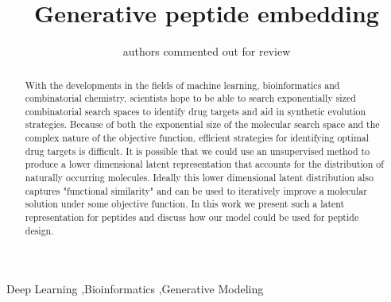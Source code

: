 \documentclass[final,1p,times,twocolumn]{elsarticle}
\begin{document}
\begin{frontmatter}


\title{Generative peptide embedding}




\author{authors commented out for review}

\begin{abstract}
With the developments in the fields of machine learning, bioinformatics and combinatorial chemistry, scientists hope to be able to search exponentially sized combinatorial search spaces to identify drug targets and aid in synthetic evolution strategies. Because of both the exponential size of the molecular search space and the complex nature of the objective function, efficient strategies for identifying optimal drug targets is difficult. It is possible that we could use an unsupervised method to produce a lower dimensional latent representation that accounts for the distribution of naturally occurring molecules. Ideally this lower dimensional latent distribution also captures "functional similarity" and can be used to iteratively improve a molecular solution under some objective function. In this work we present such a latent representation for peptides and discuss how our model could be used for peptide design.
\end{abstract}

\begin{keyword}
Deep Learning \sep Bioinformatics \sep Generative Modeling


\end{keyword}

\end{frontmatter}
\end{document}
